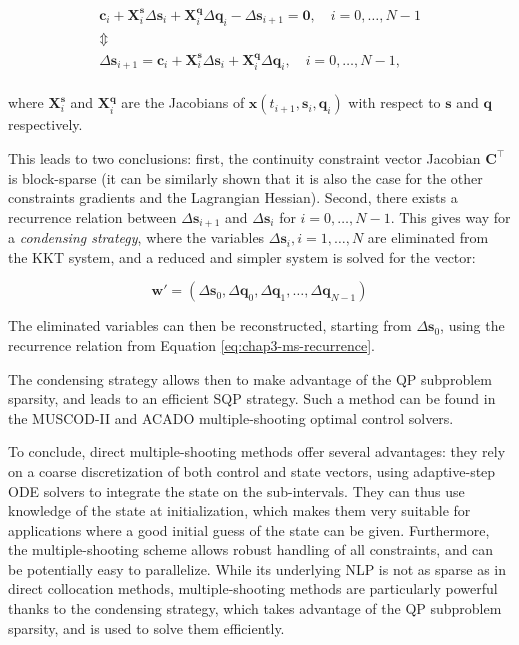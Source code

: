 \begin{equation}
\label{eq:chap3-ms-recurrence}
\begin{array}{c}
\mathbf{c}_i +
\mathbf{X}_i^\mathbf{s}\Delta\mathbf{s}_i +
\mathbf{X}_i^\mathbf{q}\Delta\mathbf{q}_i - \Delta\mathbf{s}_{i+1}=\mathbf{0}, \quad i=0,\ldots,N-1\\
\Updownarrow\\
\Delta\mathbf{s}_{i+1}=\mathbf{c}_i + \mathbf{X}_i^\mathbf{s}\Delta\mathbf{s}_i +
\mathbf{X}_i^\mathbf{q}\Delta\mathbf{q}_i, \quad i=0,\ldots,N-1,\\
\end{array}
\end{equation}

where $\mathbf{X}_i^\mathbf{s}$ and $\mathbf{X}_i^\mathbf{q}$ are the
Jacobians of $\mathbf{x}(t_{i+1},\mathbf{s}_i,\mathbf{q}_i)$ with
respect to $\mathbf{s}$ and $\mathbf{q}$ respectively.

This leads to two conclusions: first, the continuity constraint vector
Jacobian $\mathbf{C}^\top$ is block-sparse (it can be similarly shown
that it is also the case for the other constraints gradients and the
Lagrangian Hessian). Second, there exists a recurrence relation
between $\Delta\mathbf{s}_{i+1}$ and $\Delta\mathbf{s}_i$ for
$i=0,\ldots,N-1$. This gives way for a \emph{condensing strategy},
where the variables $\Delta\mathbf{s}_i, i=1,\ldots,N$ are eliminated
from the KKT system, and a reduced and simpler system is solved for
the vector:

\begin{equation}
  \mathbf{w}' =
  (\Delta\mathbf{s}_0,\Delta\mathbf{q}_0,\Delta\mathbf{q}_1,
  \ldots,\Delta\mathbf{q}_{N-1})
\end{equation}

The eliminated variables can then be reconstructed, starting from
$\Delta\mathbf{s}_0$, using the recurrence relation from Equation
\ref{eq:chap3-ms-recurrence}.

The condensing strategy allows then to make advantage of the QP
subproblem sparsity, and leads to an efficient SQP strategy. Such a
method can be found in the \textsc{MUSCOD-II}
\cite{leineweber2003efficient1,leineweber2003efficient2} and
\textsc{ACADO} \cite{houska2010acado} multiple-shooting optimal
control solvers.

To conclude, direct multiple-shooting methods offer several
advantages: they rely on a coarse discretization of both control and
state vectors, using adaptive-step ODE solvers to integrate the state
on the sub-intervals. They can thus use knowledge of the state at
initialization, which makes them very suitable for applications where
a good initial guess of the state can be given. Furthermore, the
multiple-shooting scheme allows robust handling of all constraints,
and can be potentially easy to parallelize. While its underlying NLP
is not as sparse as in direct collocation methods, multiple-shooting
methods are particularly powerful thanks to the condensing strategy,
which takes advantage of the QP subproblem sparsity, and is used to
solve them efficiently.

